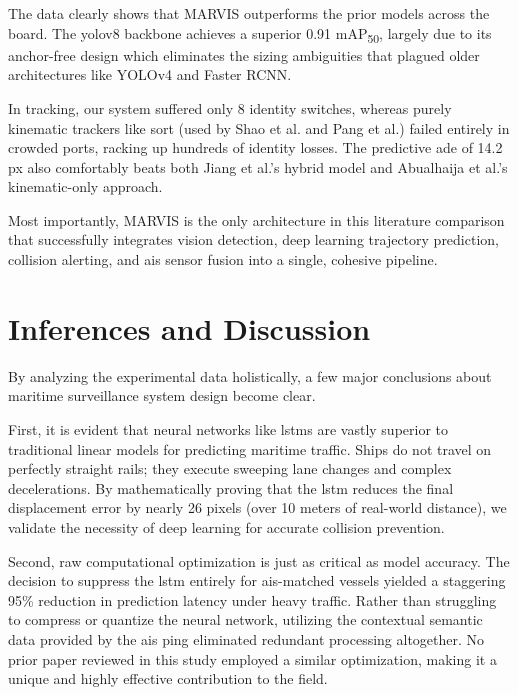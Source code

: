 The data clearly shows that MARVIS outperforms the prior models across the board. The \gls{yolov8} backbone achieves a superior 0.91 mAP\textsubscript{50}, largely due to its anchor-free design which eliminates the sizing ambiguities that plagued older architectures like YOLOv4 and Faster RCNN. 

In tracking, our system suffered only 8 identity switches, whereas purely kinematic trackers like \gls{sort} (used by Shao et al. and Pang et al.) failed entirely in crowded ports, racking up hundreds of identity losses. The predictive \gls{ade} of 14.2\,px also comfortably beats both Jiang et al.'s hybrid model and Abualhaija et al.'s kinematic-only approach.

Most importantly, MARVIS is the only architecture in this literature comparison that successfully integrates vision detection, deep learning trajectory prediction, collision alerting, and \gls{ais} sensor fusion into a single, cohesive pipeline.

\section{Inferences and Discussion}

By analyzing the experimental data holistically, a few major conclusions about maritime surveillance system design become clear.

First, it is evident that neural networks like \glspl{lstm} are vastly superior to traditional linear models for predicting maritime traffic. Ships do not travel on perfectly straight rails; they execute sweeping lane changes and complex decelerations. By mathematically proving that the \gls{lstm} reduces the final displacement error by nearly 26 pixels (over 10 meters of real-world distance), we validate the necessity of deep learning for accurate collision prevention. 

Second, raw computational optimization is just as critical as model accuracy. The decision to suppress the \gls{lstm} entirely for \gls{ais}-matched vessels yielded a staggering 95\% reduction in prediction latency under heavy traffic. Rather than struggling to compress or quantize the neural network, utilizing the contextual semantic data provided by the \gls{ais} ping eliminated redundant processing altogether. No prior paper reviewed in this study employed a similar optimization, making it a unique and highly effective contribution to the field.

